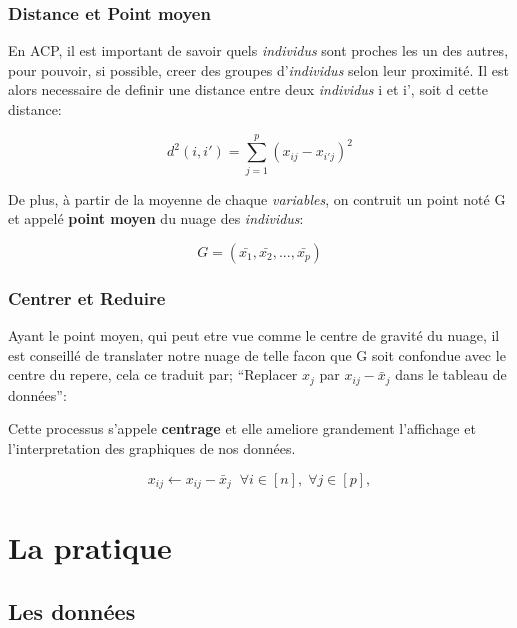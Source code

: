 \documentclass{article}
\begin{document}
\subsubsection{Distance et Point moyen}
En ACP, il est important de savoir quels \textit{individus} sont proches les un des autres, pour pouvoir, si possible, creer des groupes d'\textit{individus} selon leur proximité. Il est alors necessaire de definir une distance entre deux \textit{individus} i et i', soit d cette distance:

\begin{equation*}
d^2(i,i')=\sum_{j=1}^{p}{(x_{ij}-x_{i'j})^2} 
\end{equation*}

\newpage

De plus, à partir de la moyenne de chaque \textit{variables}, on contruit un point noté G et appelé \textbf{point moyen} du nuage des \textit{individus}:

\begin{equation*}
G=(\bar{x_1},\bar{x_2},...,\bar{x_p})
\end{equation*}

\subsubsection{Centrer et Reduire}
Ayant le point moyen, qui peut etre vue comme le centre de gravité du nuage, il est conseillé de translater notre nuage de telle facon que G soit confondue avec le centre du repere, cela ce traduit par; ``Replacer $x_j$ par $x_{ij}-\bar{x}_j$ dans le tableau de données'':
\newline

Cette processus s'appele \textbf{centrage} et elle ameliore grandement l'affichage et l'interpretation des graphiques de nos données.

\begin{equation*}
x_{ij} \leftarrow x_{ij}-\bar{x}_j \;\; \forall i \in [n], \; \forall j \in [p], 
\end{equation*}




\newpage

\section{La pratique}

\subsection{Les données}
\end{document}
